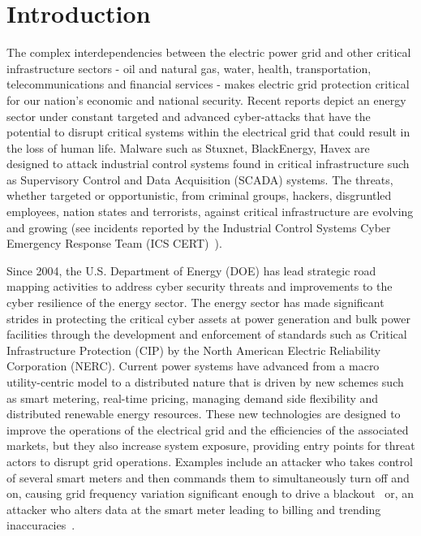 \documentclass[conference]{IEEEtran}
\begin{document}
\section{Introduction}

The complex interdependencies between the electric power grid and other critical infrastructure sectors - oil and natural gas, water, health, transportation, telecommunications and financial services - makes electric grid protection critical for our nation's economic and national security.  Recent reports depict an energy sector under constant targeted and advanced cyber-attacks that have the potential to disrupt critical systems within the electrical grid that could result in the loss of human life.  Malware such as Stuxnet, BlackEnergy, Havex  \cite{BlackEnergy:2016,Havex:2014,Sandworm:2014} are designed to attack industrial control systems found in critical infrastructure such as Supervisory Control and Data Acquisition (SCADA) systems. The threats, whether targeted or opportunistic, from criminal groups, hackers, disgruntled employees, nation states and terrorists, against critical infrastructure are evolving and growing (see incidents reported by the Industrial Control Systems Cyber Emergency Response Team (ICS CERT)~\cite{ICS-CERT:2016}). 

Since 2004, the U.S. Department of Energy (DOE) has lead strategic road mapping activities to address cyber security threats and improvements to the cyber resilience of the energy sector.  The energy sector has made significant strides in protecting the critical cyber assets at power generation and bulk power facilities through the development and enforcement of standards such as Critical Infrastructure Protection (CIP) by the North American Electric Reliability Corporation (NERC). Current power systems have advanced from a macro utility-centric model to a distributed nature that is driven by new schemes such as smart metering, real-time pricing, managing demand side flexibility and distributed renewable energy resources. These new technologies are designed to improve the operations of the electrical grid and the efficiencies of the associated markets, but they also increase system exposure, providing entry points for threat actors to disrupt grid operations.  Examples include an attacker who takes control of several smart meters and then commands them to simultaneously turn off and on, causing grid frequency variation significant enough to drive a blackout~\cite{Smartgridawareness:2015} or, an attacker who alters data at the smart meter leading to billing and trending inaccuracies~\cite{Costache:CND2011}. 
\end{document}
